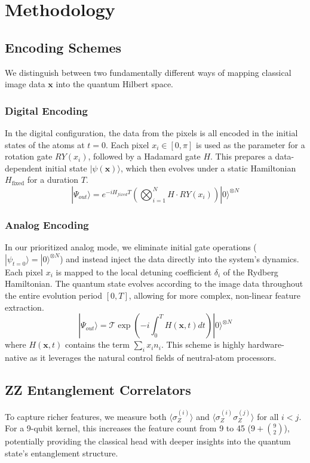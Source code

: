 \documentclass[11pt,a4paper]{article}
\begin{document}
\section{Methodology}

\subsection{Encoding Schemes}
We distinguish between two fundamentally different ways of mapping classical image data $\mathbf{x}$ into the quantum Hilbert space.

\subsubsection{Digital Encoding}
In the digital configuration, the data from the pixels is all encoded in the initial states of the atoms at $t=0$. Each pixel $x_i \in [0, \pi]$ is used as the parameter for a rotation gate $RY(x_i)$, followed by a Hadamard gate $H$. This prepares a data-dependent initial state $|\psi(\mathbf{x})\rangle$, which then evolves under a static Hamiltonian $H_{\text{fixed}}$ for a duration $T$.
\begin{equation}
|\Psi_{out}\rangle = e^{-i H_{fixed} T} \left( \bigotimes_{i=1}^N H \cdot RY(x_i) \right) |0\rangle^{\otimes N}
\end{equation}

\subsubsection{Analog Encoding}
In our prioritized analog mode, we eliminate initial gate operations ($|\psi_{t=0}\rangle = |0\rangle^{\otimes N}$) and instead inject the data directly into the system's dynamics. Each pixel $x_i$ is mapped to the local detuning coefficient $\delta_i$ of the Rydberg Hamiltonian. The quantum state evolves according to the image data throughout the entire evolution period $[0, T]$, allowing for more complex, non-linear feature extraction.
\begin{equation}
|\Psi_{out}\rangle = \mathcal{T} \exp \left( -i \int_0^T H(\mathbf{x}, t) dt \right) |0\rangle^{\otimes N}
\end{equation}
where $H(\mathbf{x}, t)$ contains the term $\sum_i x_i n_i$. This scheme is highly hardware-native as it leverages the natural control fields of neutral-atom processors.

\subsection{ZZ Entanglement Correlators}
To capture richer features, we measure both $\langle \sigma_Z^{(i)} \rangle$ and $\langle \sigma_Z^{(i)} \sigma_Z^{(j)} \rangle$ for all $i < j$. For a 9-qubit kernel, this increases the feature count from 9 to 45 ($9 + \binom{9}{2}$), potentially providing the classical head with deeper insights into the quantum state's entanglement structure.
\end{document}
